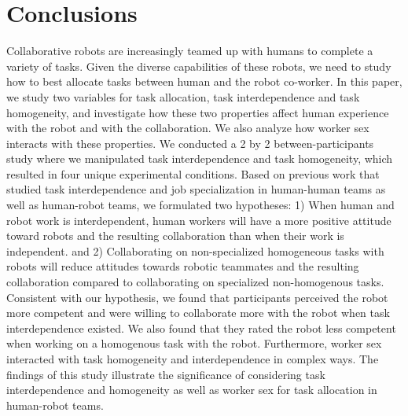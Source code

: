 \section{Conclusions}
       Collaborative robots are increasingly teamed up with humans to complete a variety of tasks. Given the diverse capabilities of these robots, we need to study how to best allocate tasks between human and the robot co-worker. In this paper, we study two variables for task allocation, task interdependence and task homogeneity, and investigate how these two properties affect human experience with the robot and with the collaboration. We also analyze how worker sex interacts with these properties. We conducted a 2 by 2 between-participants study where we manipulated task interdependence and task homogeneity, which resulted in four unique experimental conditions. Based on previous work that studied task interdependence and job specialization in  human-human teams as well as human-robot teams, we formulated two hypotheses: 1) When human and robot work is interdependent, human workers will have a more positive attitude toward robots and the resulting collaboration than when their work is independent. and 2) Collaborating on non-specialized homogeneous tasks with robots will reduce attitudes towards robotic teammates and the resulting collaboration compared to collaborating on specialized non-homogenous tasks. Consistent with our hypothesis, we found that participants perceived the robot more competent and were willing to collaborate more with the robot when task interdependence existed. We also found that they rated the robot less competent when working on a homogenous task  with the robot. Furthermore,  worker sex interacted with task homogeneity and interdependence in complex ways. The findings of this study illustrate the significance of considering task interdependence and homogeneity  as well as worker sex for task allocation in human-robot teams.